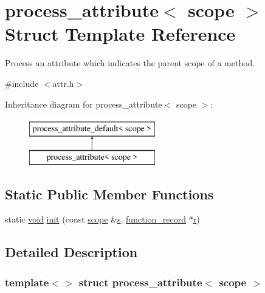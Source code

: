 \hypertarget{structprocess__attribute_3_01scope_01_4}{}\section{process\+\_\+attribute$<$ scope $>$ Struct Template Reference}
\label{structprocess__attribute_3_01scope_01_4}


Process an attribute which indicates the parent scope of a method.  




{\ttfamily \#include $<$attr.\+h$>$}

Inheritance diagram for process\+\_\+attribute$<$ scope $>$\+:\begin{figure}[H]
\begin{center}
\leavevmode
\includegraphics[height=2.000000cm]{structprocess__attribute_3_01scope_01_4}
\end{center}
\end{figure}
\subsection*{Static Public Member Functions}
\begin{DoxyCompactItemize}
\item 
static \mbox{\hyperlink{_s_d_l__opengles2__gl2ext_8h_ae5d8fa23ad07c48bb609509eae494c95}{void}} \mbox{\hyperlink{structprocess__attribute_3_01scope_01_4_ae4a63c947913d6a637f865a2801ed778}{init}} (const \mbox{\hyperlink{structscope}{scope}} \&\mbox{\hyperlink{_s_d_l__opengl_8h_a4af680a6c683f88ed67b76f207f2e6e4}{s}}, \mbox{\hyperlink{structfunction__record}{function\+\_\+record}} $\ast$\mbox{\hyperlink{_s_d_l__opengl_8h_a42ce7cdc612e53abee15043f80220d97}{r}})
\end{DoxyCompactItemize}


\subsection{Detailed Description}
\subsubsection*{template$<$$>$\newline
struct process\+\_\+attribute$<$ scope $>$}

